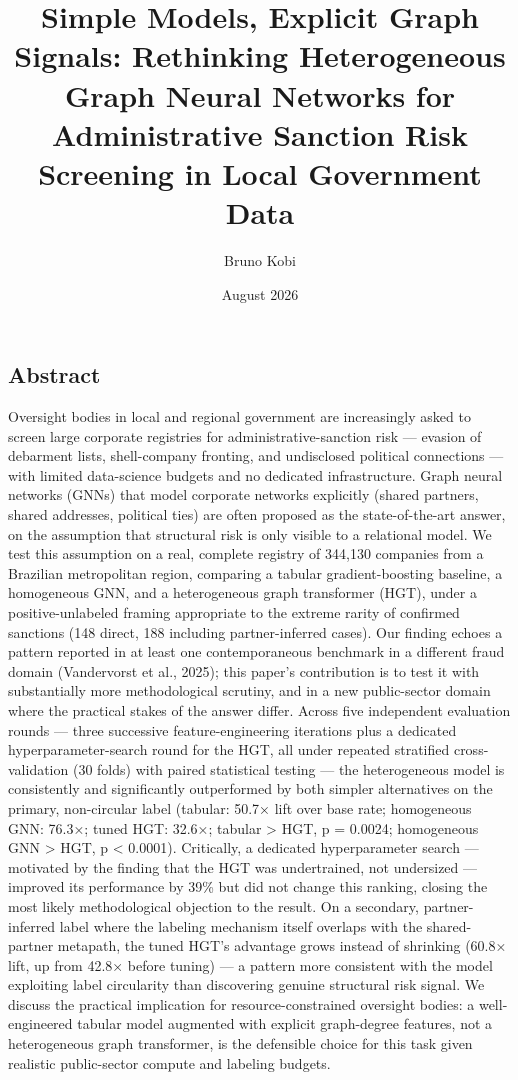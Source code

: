 \documentclass[11pt,]{article}
\title{Simple Models, Explicit Graph Signals: Rethinking Heterogeneous Graph
Neural Networks for Administrative Sanction Risk Screening in Local
Government Data}
\author{Bruno Kobi}
\date{August 2026}
\begin{document}
\maketitle

\hypertarget{abstract}{%
\subsection{Abstract}\label{abstract}}

Oversight bodies in local and regional government are increasingly asked
to screen large corporate registries for administrative-sanction risk
--- evasion of debarment lists, shell-company fronting, and undisclosed
political connections --- with limited data-science budgets and no
dedicated infrastructure. Graph neural networks (GNNs) that model
corporate networks explicitly (shared partners, shared addresses,
political ties) are often proposed as the state-of-the-art answer, on
the assumption that structural risk is only visible to a relational
model. We test this assumption on a real, complete registry of 344,130
companies from a Brazilian metropolitan region, comparing a tabular
gradient-boosting baseline, a homogeneous GNN, and a heterogeneous graph
transformer (HGT), under a positive-unlabeled framing appropriate to the
extreme rarity of confirmed sanctions (148 direct, 188 including
partner-inferred cases). Our finding echoes a pattern reported in at
least one contemporaneous benchmark in a different fraud domain
(Vandervorst et al., 2025); this paper's contribution is to test it with
substantially more methodological scrutiny, and in a new public-sector
domain where the practical stakes of the answer differ. Across five
independent evaluation rounds --- three successive feature-engineering
iterations plus a dedicated hyperparameter-search round for the HGT, all
under repeated stratified cross-validation (30 folds) with paired
statistical testing --- the heterogeneous model is consistently and
significantly outperformed by both simpler alternatives on the primary,
non-circular label (tabular: 50.7× lift over base rate; homogeneous GNN:
76.3×; tuned HGT: 32.6×; tabular \textgreater{} HGT, p = 0.0024;
homogeneous GNN \textgreater{} HGT, p \textless{} 0.0001). Critically, a
dedicated hyperparameter search --- motivated by the finding that the
HGT was undertrained, not undersized --- improved its performance by
39\% but did not change this ranking, closing the most likely
methodological objection to the result. On a secondary, partner-inferred
label where the labeling mechanism itself overlaps with the
shared-partner metapath, the tuned HGT's advantage grows instead of
shrinking (60.8× lift, up from 42.8× before tuning) --- a pattern more
consistent with the model exploiting label circularity than discovering
genuine structural risk signal. We discuss the practical implication for
resource-constrained oversight bodies: a well-engineered tabular model
augmented with explicit graph-degree features, not a heterogeneous graph
transformer, is the defensible choice for this task given realistic
public-sector compute and labeling budgets.
\end{document}
